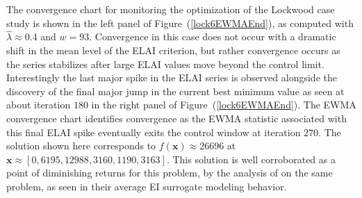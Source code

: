 \documentclass{article}
\def \lockLamb {
        0.4
}
\begin{document}

%
%

%
The convergence chart for monitoring the optimization of the Lockwood case 
study is shown in the left panel of Figure~(\ref{lock6EWMAEnd}), as computed 
with $\hat\lambda\approx\lockLamb$ and $w=93$. Convergence in this case does 
not occur with a dramatic shift in the mean level of the ELAI criterion, but 
rather convergence occurs as the series stabilizes after large ELAI values 
move beyond the control limit. Interestingly the last major spike in the ELAI 
series is observed alongside the discovery of the final major jump in the 
current best minimum value as seen at about iteration $180$ in the right panel 
of Figure~(\ref{lock6EWMAEnd}). The EWMA convergence chart identifies 
convergence as the EWMA statistic associated with this final ELAI spike 
eventually exits the control window at iteration $270$. The solution shown here 
corresponds to $f(\bm{x})\approx26696$ at $\bm{x}\approx[0, 6195, 12988, 3160, 1190, 3163]$. 
This solution is well corroborated as a point of diminishing returns for this 
problem, by the analysis of \cite{gramacy2014} on the same problem, as seen in 
their average EI surrogate modeling behavior. 

\end{document}
